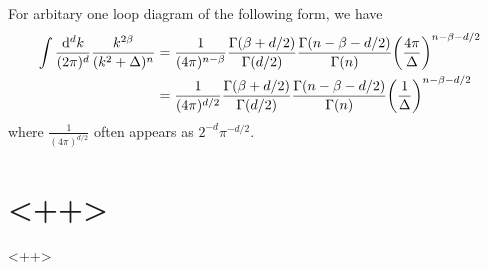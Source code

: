 \documentclass{article}
\newcommand{\vbk}{\vb{k}}
\renewcommand{\a}{\alpha}
\renewcommand{\b}{\beta}
\begin{document}
\begin{appendices}
	For arbitary one loop diagram of the following form, we have
	\begin{subequations} \label{1loopgamma}
		\begin{align}
			\int\frac{\dd^dk}{(2\pi)^d}\frac{k^{2\b}}{(k^2+\Delta)^n}
			  & =\frac{1}{(4\pi)^{n-\b}}\frac{\Gamma(\b+d/2)}{\Gamma(d/2)}\frac{\Gamma(n-\b-d/2)}{\Gamma(n)}\pqty{\frac{4\pi}{\Delta}}^{n-\b-d/2} \\
			  & =\frac{1}{(4\pi)^{d/2}}\frac{\Gamma(\b+d/2)}{\Gamma(d/2)}\frac{\Gamma(n-\b-d/2)}{\Gamma(n)}\pqty{\frac{1}{\Delta}}^{n-\b-d/2}
		\end{align}
	\end{subequations}
	where $\frac{1}{(4\pi)^{d/2}}$ often appears as $2^{-d}\pi^{-d/2}$.
	\section{<++>}<++>
\end{appendices}
\end{document}
